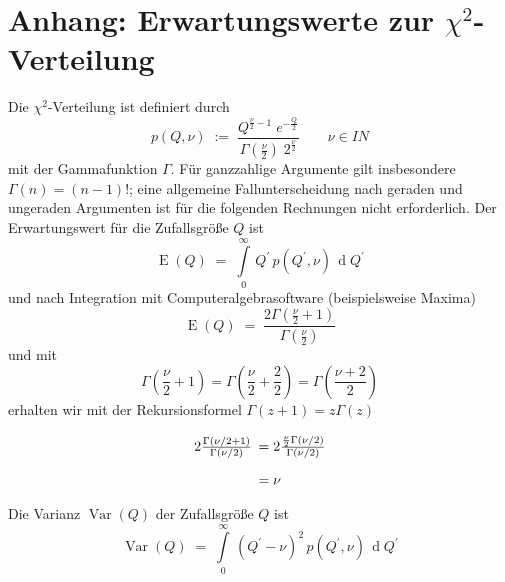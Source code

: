\section{Anhang: Erwartungswerte zur $\chi^2$-Verteilung}
\label{ErwaChi2}
Die $\chi^2$-Verteilung ist definiert durch
\begin{equation}
p(Q,\nu) \; := \; \frac{ Q^{\frac{\nu}{2}-1} \; e^{-\frac{Q}{2}}}
{\Gamma\left(\frac{\nu}{2}\right) \; 2^{\frac{\nu}{2}}} \qquad \nu \in I \! \! N
\end{equation}
mit der Gammafunktion $\Gamma$. Für ganzzahlige Argumente gilt insbesondere
$\Gamma(n)=(n-1)!$; eine allgemeine Fallunterscheidung nach geraden und ungeraden
Argumenten ist für die folgenden Rechnungen nicht erforderlich.
Der Erwartungswert für die Zufallsgröße $Q$ ist
\begin{equation}
\operatorname{E}(Q) \; = \; \int\limits_{0}^{\infty} \, Q^\prime \, p(Q^\prime,\nu) \,
\operatorname{d}Q^\prime
\end{equation}
und nach Integration mit Computeralgebrasoftware (beispielsweise Maxima)
\begin{equation}
\operatorname{E}(Q) \; = \; \frac{2 \Gamma\left(\frac{\nu}{2} + 1 \right)}{\Gamma\left(\frac{\nu}{2}\right)}
\end{equation}
und mit
$$
\Gamma\left(\frac{\nu}{2} + 1 \right) =
\Gamma\left(\frac{\nu}{2} + \frac{2}{2} \right) = \Gamma\left(\frac{\nu+2}{2}\right)
$$
erhalten wir mit der Rekursionsformel $\Gamma(z+1)=z\Gamma(z)$
\begin{equation}
\arraycolsep=2.4pt\def\arraystretch{2}
\begin{array}{ll}
2 \frac{\Gamma(\nu/2 + 1)}{\Gamma(\nu/2)}
 & = 2 \frac{\frac{\nu}{2}\Gamma(\nu/2)}{\Gamma(\nu/2)} \\
 & = \nu
\end{array}
\end{equation}
Die Varianz $\operatorname{Var}(Q)$ der Zufallsgröße $Q$ ist
\begin{equation}
\operatorname{Var}(Q) \; = \; \int\limits_{0}^{\infty} \, (Q^\prime
- \nu)^2 \, p(Q^\prime,\nu) \,
\operatorname{d}Q^\prime
\end{equation}
